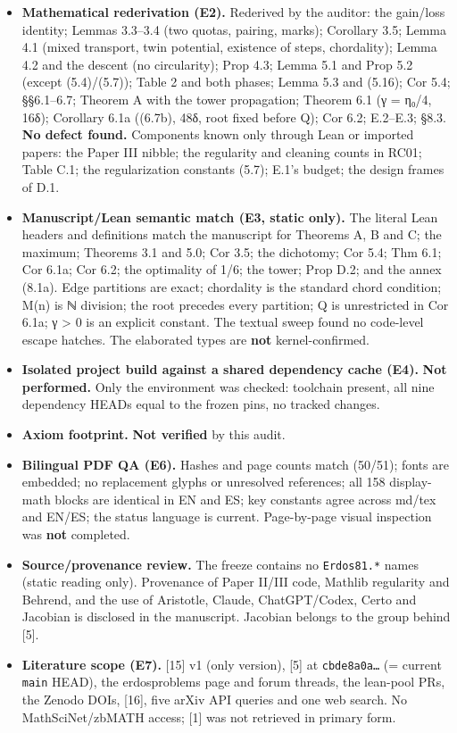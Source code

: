 \documentclass[10pt,a4paper]{article}
\begin{document}
\begin{itemize}\item \textbf{Mathematical rederivation (E2).} Rederived by the auditor: the gain/loss identity; Lemmas 3.3–3.4 (two quotas, pairing, marks); Corollary 3.5; Lemma 4.1 (mixed transport, twin potential, existence of steps, chordality); Lemma 4.2 and the descent (no circularity); Prop 4.3; Lemma 5.1 and Prop 5.2 (except (5.4)/(5.7)); Table 2 and both phases; Lemma 5.3 and (5.16); Cor 5.4; §§6.1–6.7; Theorem A with the tower propagation; Theorem 6.1 (γ = η₀/4, 16δ); Corollary 6.1a ((6.7b), 48δ, root fixed before Q); Cor 6.2; E.2–E.3; §8.3. \textbf{No defect found.} Components known only through Lean or imported papers: the Paper III nibble; the regularity and cleaning counts in RC01; Table C.1; the regularization constants (5.7); E.1's budget; the design frames of D.1.\item \textbf{Manuscript/Lean semantic match (E3, static only).} The literal Lean headers and definitions match the manuscript for Theorems A, B and C; the maximum; Theorems 3.1 and 5.0; Cor 3.5; the dichotomy; Cor 5.4; Thm 6.1; Cor 6.1a; Cor 6.2; the optimality of 1/6; the tower; Prop D.2; and the annex (8.1a). Edge partitions are exact; chordality is the standard chord condition; M(n) is ℕ division; the root precedes every partition; Q is unrestricted in Cor 6.1a; γ > 0 is an explicit constant. The textual sweep found no code-level escape hatches. The elaborated types are \textbf{not} kernel-confirmed.\item \textbf{Isolated project build against a shared dependency cache (E4).} \textbf{Not performed.} Only the environment was checked: toolchain present, all nine dependency HEADs equal to the frozen pins, no tracked changes.\item \textbf{Axiom footprint.} \textbf{Not verified} by this audit.\item \textbf{Bilingual PDF QA (E6).} Hashes and page counts match (50/51); fonts are embedded; no replacement glyphs or unresolved references; all 158 display-math blocks are identical in EN and ES; key constants agree across md/tex and EN/ES; the status language is current. Page-by-page visual inspection was \textbf{not} completed.\item \textbf{Source/provenance review.} The freeze contains no \texttt{Erdos81.*} names (static reading only). Provenance of Paper II/III code, Mathlib regularity and Behrend, and the use of Aristotle, Claude, ChatGPT/Codex, Certo and Jacobian is disclosed in the manuscript. Jacobian belongs to the group behind [5].\item \textbf{Literature scope (E7).} [15] v1 (only version), [5] at \texttt{cbde8a0a…} (= current \texttt{main} HEAD), the erdosproblems page and forum threads, the lean-pool PRs, the Zenodo DOIs, [16], five arXiv API queries and one web search. No MathSciNet/zbMATH access; [1] was not retrieved in primary form.\end{itemize}
\end{document}
